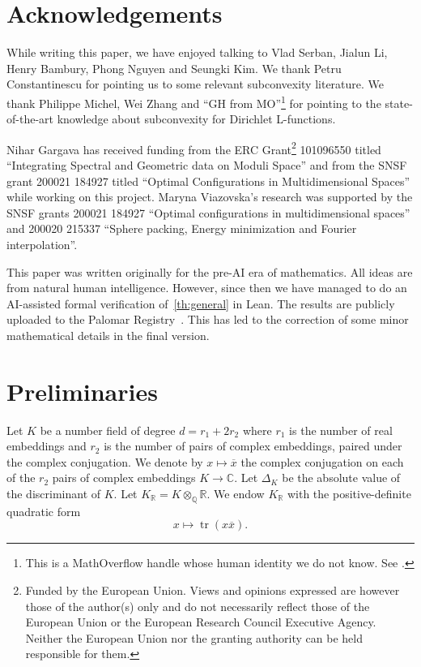 \documentclass[a4paper]{article}
\theoremstyle{definition}
\theoremstyle{remark}
\DeclareMathOperator{\Tr}{tr}
\newcommand{\KR}{K_{\mathbb{R}}}
\begin{document}
\section*{Acknowledgements}
While writing this paper, we have enjoyed talking to Vlad Serban, Jialun Li, Henry Bambury, Phong Nguyen and Seungki Kim. 
We thank Petru Constantinescu for pointing us to some relevant subconvexity literature. We thank Philippe Michel, Wei Zhang and ``GH from MO''\footnote{This is a MathOverflow handle whose human identity we do not know. See \cite{MOconv}.
} 
for pointing to the state-of-the-art knowledge about subconvexity for Dirichlet L-functions.

Nihar Gargava has received funding from the ERC Grant\footnote{
Funded by the European Union. Views and opinions expressed are however those of the author(s) only and do not necessarily reflect those of the European Union or the European Research Council Executive Agency. Neither the European Union nor the granting authority can be held responsible for them.
}
101096550 titled ``Integrating Spectral and Geometric data on Moduli Space'' 
and from the SNSF grant 200021 184927 titled ``Optimal Configurations in Multidimensional Spaces'' while working on this project. 
Maryna Viazovska's research was supported by the SNSF grants  200021 184927 ``Optimal configurations in multidimensional spaces''  and  200020 215337 ``Sphere packing, Energy minimization and Fourier interpolation''.

This paper was written originally for the pre-AI era of mathematics. All ideas are from natural human intelligence.
However, since then we have managed to do an AI-assisted formal verification of~\cref{th:general} in Lean.
The results are publicly uploaded to the Palomar Registry~\cite{GargavaMeanValueRepo}.
This has led to the correction of some minor mathematical details in the final version.


\section{Preliminaries}
  \label{se:setup}

Let $K$ be a number field of degree $d=r_1 + 2r_2$ where $r_1$ is the number of real embeddings and $r_2$ is the number of pairs of complex embeddings, paired under the complex conjugation. 
We denote by $x \mapsto \overline{x}$ the complex conjugation on each of the $r_2$ pairs of complex embeddings $K \rightarrow \mathbb{C}$.
Let $\Delta_K$ be the absolute value of the discriminant of $K$.
Let $\KR = K \otimes_{\mathbb{Q}} \mathbb{R}$.
We endow $\KR$ with the positive-definite quadratic form
\begin{equation}
\label{eq:norm}
  x \mapsto \Tr(x \overline{x}).
\end{equation}
\end{document}

